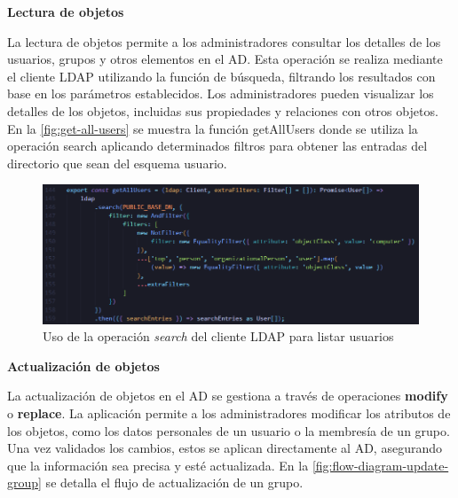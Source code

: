 \textbf{Lectura de objetos}

La lectura de objetos permite a los administradores consultar los detalles de los usuarios, grupos y otros elementos en el AD. Esta operación se realiza mediante el cliente LDAP utilizando la función de búsqueda, filtrando los resultados con base en los parámetros establecidos. Los administradores pueden visualizar los detalles de los objetos, incluidas sus propiedades y relaciones con otros objetos. En la \autoref{fig:get-all-users} se muestra la función getAllUsers donde se utiliza la operación search aplicando determinados filtros para obtener las entradas del directorio que sean del esquema usuario.

\begin{figure}[H]
    \centering
    \includegraphics[width=\linewidth]{images/code/getAllUsers.png}
    \caption{Uso de la operación \textit{search} del cliente LDAP para listar usuarios}
    \label{fig:get-all-users}
\end{figure}

\textbf{Actualización de objetos}

La actualización de objetos en el AD se gestiona a través de operaciones \textbf{modify} o \textbf{replace}. La aplicación permite a los administradores modificar los atributos de los objetos, como los datos personales de un usuario o la membresía de un grupo. Una vez validados los cambios, estos se aplican directamente al AD, asegurando que la información sea precisa y esté actualizada. En la \autoref{fig:flow-diagram-update-group} se detalla el flujo de actualización de un grupo.

